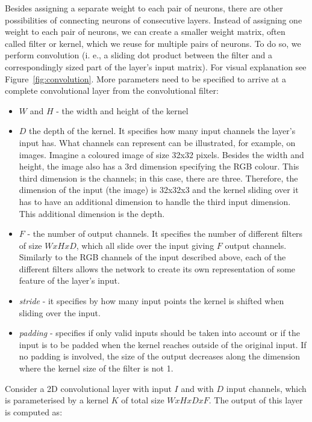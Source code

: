 Besides assigning a separate weight to each pair of neurons, there are other possibilities of connecting neurons of consecutive layers.
Instead of assigning one weight to each pair of neurons, we can create a smaller weight matrix, often called filter or kernel, which we reuse for multiple pairs of neurons. 
To do so, we perform convolution (i. e., a sliding dot product between the filter and a correspondingly sized part of the layer's input matrix). 
For visual explanation see Figure~\ref{fig:convolution}.
More parameters need to be specified to arrive at a complete convolutional layer from the convolutional filter:
\begin{itemize}
    \item $W$  and $H$ - the width and height of the kernel
    \item $D$ the depth of the kernel. 
    It specifies how many input channels the layer's input has.
    What channels can represent can be illustrated, for example, on images.
    Imagine a coloured image of size 32x32 pixels.
    Besides the width and height, the image also has a 3rd dimension specifying the RGB colour. This third dimension is the channels; in this case, there are three.
    Therefore, the dimension of the input (the image) is 32x32x3 and the kernel sliding over it has to have an additional dimension to handle the third input dimension. This additional dimension is the depth.
    \item $F$ - the number of output channels. 
    It specifies the number of different filters of size $WxHxD$, which all slide over the input giving $F$ output channels. 
    Similarly to the RGB channels of the input described above, each of the different filters allows the network to create its own representation of some feature of the layer's input.    
    \item \textit{stride} - it specifies by how many input points the kernel is shifted when sliding over the input. 
    \item \textit{padding} - specifies if only valid inputs should be taken into account or if the input is to be padded when the kernel reaches outside of the original input.
    If no padding is involved, the size of the output decreases along the dimension where the kernel size of the filter is not 1.
\end{itemize}

Consider a 2D convolutional layer with input $I$ and with $D$ input channels, which is parameterised by a kernel $K$ of total size $WxHxDxF$. The output of this layer is computed as:

